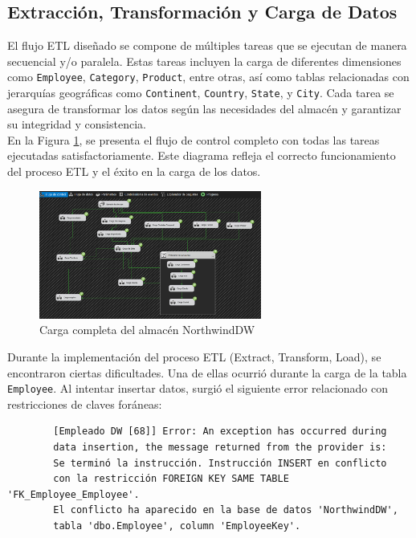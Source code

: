 \documentclass{article}
\begin{document}
	\subsection{Extracción, Transformación y Carga de Datos}
	
	El flujo ETL diseñado se compone de múltiples tareas que se ejecutan de manera secuencial y/o paralela. Estas tareas incluyen la carga de diferentes dimensiones como \texttt{Employee}, \texttt{Category}, \texttt{Product}, entre otras, así como tablas relacionadas con jerarquías geográficas como \texttt{Continent}, \texttt{Country}, \texttt{State}, y \texttt{City}. Cada tarea se asegura de transformar los datos según las necesidades del almacén y garantizar su integridad y consistencia.
	\\
	
	En la Figura \ref{fig:NorthWind}, se presenta el flujo de control completo con todas las tareas ejecutadas satisfactoriamente. Este diagrama refleja el correcto funcionamiento del proceso ETL y el éxito en la carga de los datos.
	
	\begin{figure}[H]
		\begin{center} 
			\includegraphics[width=0.65\textwidth]{images/cargaNorthwind.png} %
			\caption{Carga completa del almacén NorthwindDW}
			\label{fig:NorthWind}
		\end{center}
	\end{figure}
	
	Durante la implementación del proceso ETL (Extract, Transform, Load), se encontraron ciertas dificultades. Una de ellas ocurrió durante la carga de la tabla \texttt{Employee}. Al intentar insertar datos, surgió el siguiente error relacionado con restricciones de claves foráneas:
	
	\begin{verbatim}
		[Empleado DW [68]] Error: An exception has occurred during 
		data insertion, the message returned from the provider is: 
		Se terminó la instrucción. Instrucción INSERT en conflicto 
		con la restricción FOREIGN KEY SAME TABLE 'FK_Employee_Employee'. 
		El conflicto ha aparecido en la base de datos 'NorthwindDW', 
		tabla 'dbo.Employee', column 'EmployeeKey'.
	\end{verbatim}
	
\end{document}
